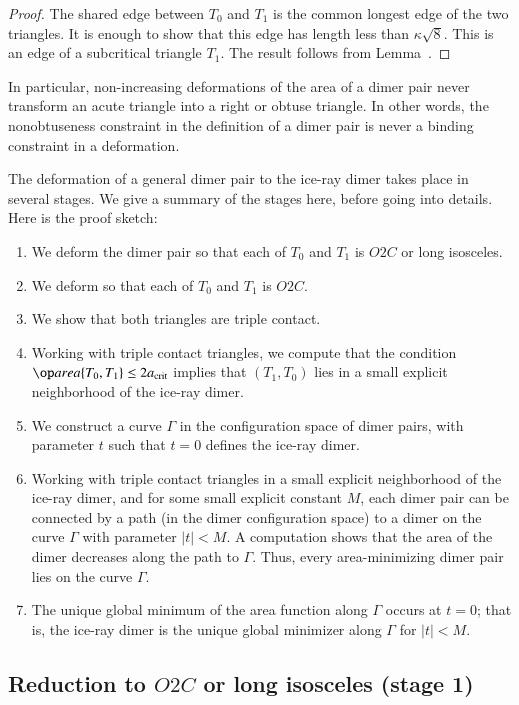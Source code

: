 \begin{proof}  
  The shared edge between $T_0$ and $T_1$ is the common longest edge
  of the two triangles.  It is enough to show that this edge has
  length less than $\kappa\sqrt8$.  This is an edge of a subcritical
  triangle $T_1$. The result follows from Lemma~.
\end{proof}

In particular, non-increasing deformations of the area of a dimer pair never
transform an acute triangle into a right or obtuse triangle.  In other
words, the nonobtuseness constraint in the definition of a dimer pair
is never a binding constraint in a deformation.

The deformation of a general dimer pair to the ice-ray dimer takes
place in several stages.  We give a summary of the stages here, before
going into details.  Here is the proof sketch:

\begin{enumerate}
\item We deform the dimer pair so that each of $T_0$ and $T_1$ is
  $O2C$ or long isosceles.
\item We deform so that each of $T_0$ and $T_1$ is $O2C$.
\item We show that both triangles are triple contact.
\item Working with triple contact triangles, we compute that the
  condition $\area\{T_0,T_1\}\le 2\acrit$ implies that $(T_1,T_0)$
  lies in a small explicit neighborhood of the ice-ray dimer.
\item We construct a curve $\Gamma$ in the configuration space of
  dimer pairs, with parameter $t$ such that $t=0$ defines the ice-ray
  dimer.
\item Working with triple contact triangles in a small explicit
  neighborhood of the ice-ray dimer, and for some small explicit
  constant $M$, each dimer pair can be connected by a path (in the
  dimer configuration space) to a dimer on the curve $\Gamma$ with
  parameter $|t|<M$.  A computation shows that the area of the dimer
  decreases along the path to $\Gamma$.  Thus, every area-minimizing
  dimer pair lies on the curve $\Gamma$.
\item The unique global minimum of the area function along $\Gamma$
  occurs at $t=0$; that is, the ice-ray dimer is the unique global
  minimizer along $\Gamma$ for $|t|<M$.
\end{enumerate}

\subsection{Reduction to $O2C$ or long isosceles (stage 1)}

